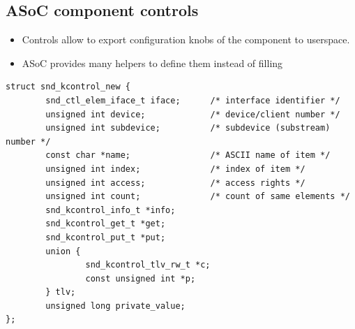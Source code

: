 \subsection{ASoC component controls}

\begin{frame}{}
  \begin{itemize}
  \item Controls allow to export configuration knobs of the component
    to userspace.
  \item ASoC provides many helpers to define them instead of filling
  \end{itemize}
\end{frame}

\begin{frame}[fragile]{}
  \begin{block}{}
    \fontsize{9}{9}\selectfont
    \begin{verbatim}
struct snd_kcontrol_new {
        snd_ctl_elem_iface_t iface;      /* interface identifier */
        unsigned int device;             /* device/client number */
        unsigned int subdevice;          /* subdevice (substream) number */
        const char *name;                /* ASCII name of item */
        unsigned int index;              /* index of item */
        unsigned int access;             /* access rights */
        unsigned int count;              /* count of same elements */
        snd_kcontrol_info_t *info;
        snd_kcontrol_get_t *get;
        snd_kcontrol_put_t *put;
        union {
                snd_kcontrol_tlv_rw_t *c;
                const unsigned int *p;
        } tlv;
        unsigned long private_value;
};
    \end{verbatim}
  \end{block}
\end{frame}

